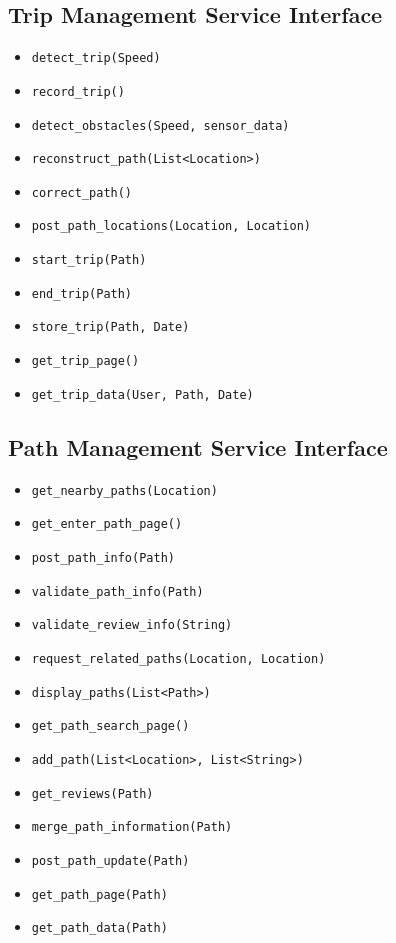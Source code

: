 \subsection{Trip Management Service Interface}
\begin{itemize}
 \item \texttt{detect\_trip(Speed)}
    \item \texttt{record\_trip()}
    \item \texttt{detect\_obstacles(Speed, sensor\_data)}
    \item \texttt{reconstruct\_path(List<Location>)}
    \item \texttt{correct\_path()}
    \item \texttt{post\_path\_locations(Location, Location)}
    \item \texttt{start\_trip(Path)}
    \item \texttt{end\_trip(Path)}
    \item \texttt{store\_trip(Path, Date)}
    \item \texttt{get\_trip\_page()}
    \item \texttt{get\_trip\_data(User, Path, Date)}
\end{itemize}

\subsection{Path Management Service Interface}
\begin{itemize}
    \item \texttt{get\_nearby\_paths(Location)}
    \item \texttt{get\_enter\_path\_page()}
    \item \texttt{post\_path\_info(Path)}
    \item \texttt{validate\_path\_info(Path)}
    \item \texttt{validate\_review\_info(String)}
    \item \texttt{request\_related\_paths(Location, Location)}
    \item \texttt{display\_paths(List<Path>)}
    \item \texttt{get\_path\_search\_page()}
    \item \texttt{add\_path(List<Location>, List<String>)}
    \item \texttt{get\_reviews(Path)}
    \item \texttt{merge\_path\_information(Path)}
    \item \texttt{post\_path\_update(Path)}
    \item \texttt{get\_path\_page(Path)}
    \item \texttt{get\_path\_data(Path)}
\end{itemize}

